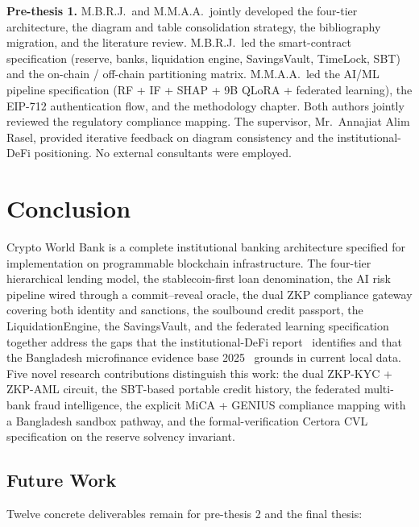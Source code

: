 \documentclass[12pt,a4paper]{report}
\begin{document}
\textbf{Pre-thesis 1.} M.B.R.J.\ and M.M.A.A.\ jointly developed the four-tier architecture, the diagram and table consolidation strategy, the bibliography migration, and the literature review. M.B.R.J.\ led the smart-contract specification (reserve, banks, liquidation engine, SavingsVault, TimeLock, SBT) and the on-chain / off-chain partitioning matrix. M.M.A.A.\ led the AI/ML pipeline specification (RF + IF + SHAP + 9B QLoRA + federated learning), the EIP-712 authentication flow, and the methodology chapter. Both authors jointly reviewed the regulatory compliance mapping. The supervisor, Mr.\ Annajiat Alim Rasel, provided iterative feedback on diagram consistency and the institutional-DeFi positioning. No external consultants were employed.

\chapter{Conclusion}
\label{ch:conclusion}

Crypto World Bank is a complete institutional banking architecture specified for implementation on programmable blockchain infrastructure. The four-tier hierarchical lending model, the stablecoin-first loan denomination, the AI risk pipeline wired through a commit--reveal oracle, the dual ZKP compliance gateway covering both identity and sanctions, the soulbound credit passport, the LiquidationEngine, the SavingsVault, and the federated learning specification together address the gaps that the institutional-DeFi report~\cite{sygnum2026defi} identifies and that the Bangladesh microfinance evidence base 2025~\cite{bangladeshBank2025,brac2025microfinance,nusMicrofinance2025} grounds in current local data. Five novel research contributions distinguish this work: the dual ZKP-KYC + ZKP-AML circuit, the SBT-based portable credit history, the federated multi-bank fraud intelligence, the explicit MiCA + GENIUS compliance mapping with a Bangladesh sandbox pathway, and the formal-verification Certora CVL specification on the reserve solvency invariant.

\section{Future Work}
\label{sec:future}

Twelve concrete deliverables remain for pre-thesis 2 and the final thesis:
\end{document}
